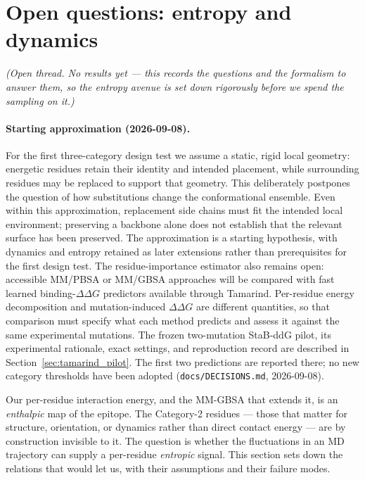 \section{Open questions: entropy and dynamics}\label{sec:entropy}
\emph{(Open thread. No results yet --- this records the questions and the formalism to answer them,
so the entropy avenue is set down rigorously before we spend the sampling on it.)}

\paragraph{Starting approximation (2026-09-08).}
For the first three-category design test we assume a static, rigid local geometry: energetic
residues retain their identity and intended placement, while surrounding residues may be replaced
to support that geometry. This deliberately postpones the question of how substitutions change
the conformational ensemble. Even within this approximation, replacement side chains must fit
the intended local environment; preserving a backbone alone does not establish that the relevant
surface has been preserved. The approximation is a starting hypothesis, with dynamics and entropy
retained as later extensions rather than prerequisites for the first design test.
The residue-importance estimator also remains open: accessible MM/PBSA or MM/GBSA approaches will
be compared with fast learned binding-$\Delta\Delta G$ predictors available through Tamarind.
Per-residue energy decomposition and mutation-induced $\Delta\Delta G$ are different quantities,
so that comparison must specify what each method predicts and assess it against the same
experimental mutations. The frozen two-mutation StaB-ddG pilot, its experimental rationale, exact settings, and
reproduction record are described in Section~\ref{sec:tamarind_pilot}. The first two predictions are reported there;
no new category thresholds have been adopted (\texttt{docs/DECISIONS.md}, 2026-09-08).

Our per-residue interaction energy, and the MM-GBSA that extends it, is an \emph{enthalpic} map of the
epitope. The Category-2 residues --- those that matter for structure, orientation, or dynamics rather
than direct contact energy --- are by construction invisible to it. The question is whether the
fluctuations in an MD trajectory can supply a per-residue \emph{entropic} signal. This section sets
down the relations that would let us, with their assumptions and their failure modes.

